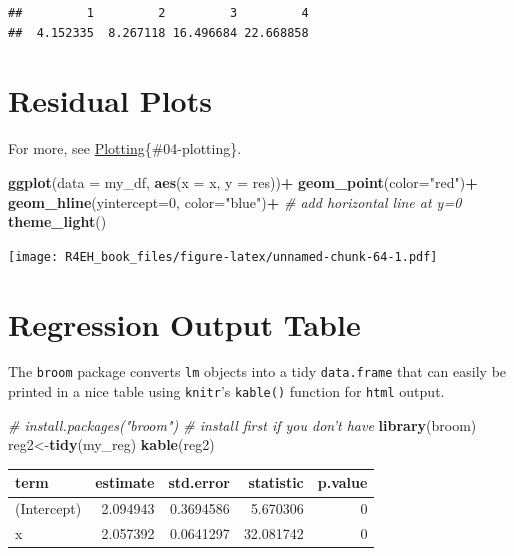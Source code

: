 \documentclass[]{book}
\newenvironment{Shaded}{\begin{snugshade}}{\end{snugshade}}
\newcommand{\KeywordTok}[1]{\textcolor[rgb]{0.13,0.29,0.53}{\textbf{#1}}}
\newcommand{\DataTypeTok}[1]{\textcolor[rgb]{0.13,0.29,0.53}{#1}}
\newcommand{\DecValTok}[1]{\textcolor[rgb]{0.00,0.00,0.81}{#1}}
\newcommand{\StringTok}[1]{\textcolor[rgb]{0.31,0.60,0.02}{#1}}
\newcommand{\CommentTok}[1]{\textcolor[rgb]{0.56,0.35,0.01}{\textit{#1}}}
\newcommand{\OperatorTok}[1]{\textcolor[rgb]{0.81,0.36,0.00}{\textbf{#1}}}
\newcommand{\NormalTok}[1]{#1}
\theoremstyle{definition}
\theoremstyle{definition}
\theoremstyle{definition}
\theoremstyle{remark}
\begin{document}
\begin{verbatim}
##         1         2         3         4 
##  4.152335  8.267118 16.496684 22.668858
\end{verbatim}

\section{Residual Plots}\label{residual-plots}

For more, see \protect\hyperlink{plotting}{Plotting}\{\#04-plotting\}.

\begin{Shaded}
\begin{Highlighting}[]
\KeywordTok{ggplot}\NormalTok{(}\DataTypeTok{data =}\NormalTok{ my_df, }\KeywordTok{aes}\NormalTok{(}\DataTypeTok{x =}\NormalTok{ x, }\DataTypeTok{y =}\NormalTok{ res))}\OperatorTok{+}
\StringTok{  }\KeywordTok{geom_point}\NormalTok{(}\DataTypeTok{color=}\StringTok{"red"}\NormalTok{)}\OperatorTok{+}
\StringTok{  }\KeywordTok{geom_hline}\NormalTok{(}\DataTypeTok{yintercept=}\DecValTok{0}\NormalTok{, }\DataTypeTok{color=}\StringTok{"blue"}\NormalTok{)}\OperatorTok{+}\StringTok{ }\CommentTok{# add horizontal line at y=0}
\StringTok{  }\KeywordTok{theme_light}\NormalTok{()}
\end{Highlighting}
\end{Shaded}

\texttt{[image: R4EH\_book\_files/figure-latex/unnamed-chunk-64-1.pdf]}

\section{Regression Output Table}\label{regression-output-table}

The \texttt{broom} package converts \texttt{lm} objects into a tidy
\texttt{data.frame} that can easily be printed in a nice table using
\texttt{knitr}'s \texttt{kable()} function for \texttt{html} output.

\begin{Shaded}
\begin{Highlighting}[]
\CommentTok{# install.packages("broom") # install first if you don't have }
\KeywordTok{library}\NormalTok{(broom)}
\NormalTok{reg2<-}\KeywordTok{tidy}\NormalTok{(my_reg)}
\KeywordTok{kable}\NormalTok{(reg2)}
\end{Highlighting}
\end{Shaded}

\begin{tabular}{l|r|r|r|r}
\hline
term & estimate & std.error & statistic & p.value\\
\hline
(Intercept) & 2.094943 & 0.3694586 & 5.670306 & 0\\
\hline
x & 2.057392 & 0.0641297 & 32.081742 & 0\\
\hline
\end{tabular}
\end{document}
